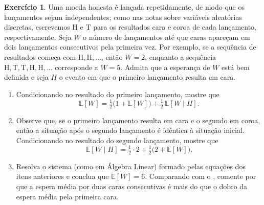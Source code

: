 \documentclass[12pt,portuguese]{article}
\theoremstyle{definition}
\newtheorem{exercise}{Exercício}
\begin{document}
\begin{exercise}\label{exercise:duas-caras-consecutivas}
Uma moeda honesta é lançada repetidamente, de modo que os lançamentos sejam
independentes; como nas notas sobre variáveis aleatórias discretas,
escrevemos \(\mathrm{H}\) e \(\mathrm{T}\) para os resultados cara e coroa
de cada lançamento, respectivamente. Seja \(W\) o número de lançamentos até
que caras apareçam em dois lançamentos consecutivos pela primeira vez. Por
exemplo, se a sequência de resultados começa com
\(\mathrm{H}, \mathrm{H}, \ldots\), então \(W = 2\), enquanto a sequência
\(\mathrm{H}, \mathrm{T}, \mathrm{T}, \mathrm{H}, \mathrm{H}, \ldots\)
corresponde a \(W = 5\). Admita que a esperança de \(W\) está bem definida
e seja \(H\) o evento em que o primeiro lançamento resulta em cara.
\begin{enumerate}[label=(\alph*)]
  \item Condicionando no resultado do primeiro lançamento, mostre que
        \[
        \mathbb{E}[W]
        = \tfrac{1}{2}\bigl(1 + \mathbb{E}[W]\bigr)
        + \tfrac{1}{2}\,\mathbb{E}[W \mid H].
        \]
  \item Observe que, se o primeiro lançamento resulta em cara e o segundo em
        coroa, então a situação após o segundo lançamento é idêntica à
        situação inicial. Condicionando no resultado do segundo lançamento,
        mostre que
        \[
        \mathbb{E}[W \mid H]
        = \tfrac{1}{2} \cdot 2 + \tfrac{1}{2}\bigl(2 + \mathbb{E}[W]\bigr).
        \]
  \item Resolva o sistema (como em Álgebra Linear) formado pelas equações dos itens anteriores e
        conclua que \(\mathbb{E}[W] = 6\). Comparando com o
        , comente por que a espera média por
        duas caras consecutivas é mais do que o dobro da espera média pela
        primeira cara.
\end{enumerate}
\end{exercise}
\end{document}
